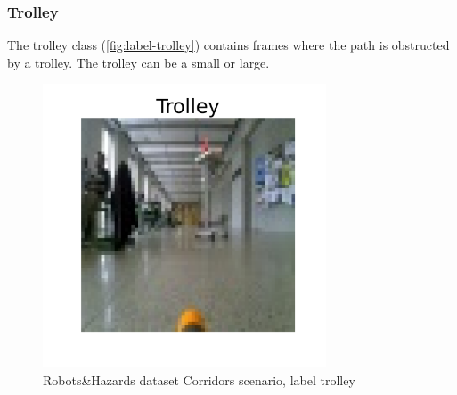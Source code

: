        \subsubsection*{Trolley}
            The trolley class (\autoref{fig:label-trolley}) contains frames where the path is obstructed by a trolley. The trolley can be a small or large.
            \begin{figure}[H]
                \centering
                \centerline{\includegraphics[width=0.75\textwidth]{img/labels/trolley.png}}
                \caption{Robots\&Hazards dataset Corridors scenario, label trolley}
                \label{fig:an-trolley}
            \end{figure}

